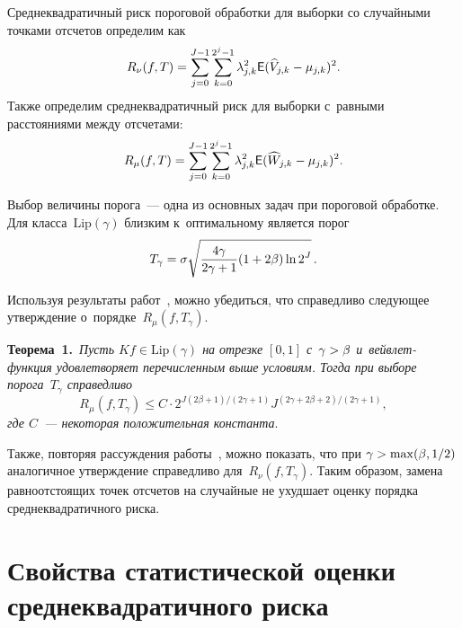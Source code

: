 \begin{multicols}{2}
\vspace*{-2pt}

Среднеквадратичный риск пороговой обработки для выборки со случайными точками отсчетов определим как
\begin{equation*}%
R_{\nu}(f,T)=\sum\limits_{j=0}^{J-1}\sumk\lambda^2_{j,k}\e(\widehat{V}_{j,k}-\mu_{j,k})^2.
\end{equation*}
Также определим среднеквадратичный риск для выборки с~равными расстояниями между отсчетами:
\begin{equation*}%
R_{\mu}(f,T)=\sum\limits_{j=0}^{J-1}\sumk\lambda^2_{j,k}\e(\widehat{W}_{j,k}-\mu_{j,k})^2.
\end{equation*}


Выбор величины порога~--- одна из основных задач при пороговой обработке. 
Для класса~$\mathrm{Lip}(\gamma)$ близким к~оптимальному является порог 
$$
T_\gamma
=\sigma\sqrt{\displaystyle\frac{\displaystyle 4\gamma\mathstrut}{\displaystyle {2\gamma+1}\mathstrut}(1+2\beta)\ln 2^J}\,.
$$ 

Используя результаты 
работ~\cite{D94, J99}, можно убедиться, что справедливо следующее утверждение о~порядке~$R_{\mu}(f,T_\gamma)$.

\smallskip

\noindent
\textbf{Теорема~1.}\ \textit{Пусть $Kf\in\mathrm{Lip}(\gamma)$ на 
отрезке $[0,1]$ с~$\gamma\hm>\beta$ 
и~вейв\-лет-функ\-ция удовлетворяет перечисленным выше условиям. Тогда при выборе порога~$T_\gamma$ справедливо}
\begin{equation*}%
R_{\mu}(f,T_\gamma)\leqslant  C\cdot 
2^{J({2\beta+1})/({2\gamma+1})}
J^{({2\gamma+2\beta+2})/({2\gamma+1})},  
\end{equation*}
\textit{где $C$~--- некоторая положительная константа}.

\pagebreak

\smallskip

Также, повторяя рассуждения работы~\cite{CB99}, можно показать, что при $\gamma\hm>\max(\beta,1/2)$ 
аналогичное утверждение справедливо для~$R_{\nu}(f,T_\gamma)$. Таким образом, замена 
равноотстоящих точек отсчетов на случайные не ухудшает оценку порядка 
сред\-не\-квад\-ра\-тич\-но\-го риска. 


\section{Свойства статистической оценки среднеквадратичного риска}


\end{multicols}
